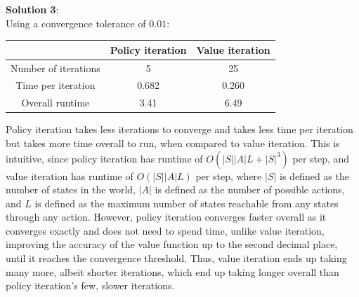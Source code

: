 \documentclass[submit]{harvardml}
\begin{document}
\textbf{Solution 3}:\\
Using a convergence tolerance of $0.01$:
\begin{center}
        \begin{tabular}{ |c|c|c| } 
        \hline
        & Policy iteration & Value iteration \\
        \hline
        Number of iterations & 5 & 25\\
        \hline
        Time per iteration & 0.682 & 0.260\\
        \hline
        Overall runtime & 3.41 & 6.49\\
        \hline
        \end{tabular}
\end{center}
Policy iteration takes less iterations to converge and takes less time per iteration but takes more time overall to run, when compared to value iteration. This is intuitive, since policy iteration has runtime of $O(|S||A|L + |S|^3)$ per step, and value iteration has runtime of $O(|S||A|L)$ per step, where $|S|$ is defined as the number of states in the world, $|A|$ is defined as the number of possible actions, and $L$ is defined as the maximum number of states reachable from any states through any action. However, policy iteration converges faster overall as it converges exactly and does not need to spend time, unlike value iteration, improving the accuracy of the value function up to the second decimal place, until it reaches the convergence threshold. Thus, value iteration ends up taking many more, albeit shorter iterations, which end up taking longer overall than policy iteration's few, slower iterations.
\newpage
\end{document}
